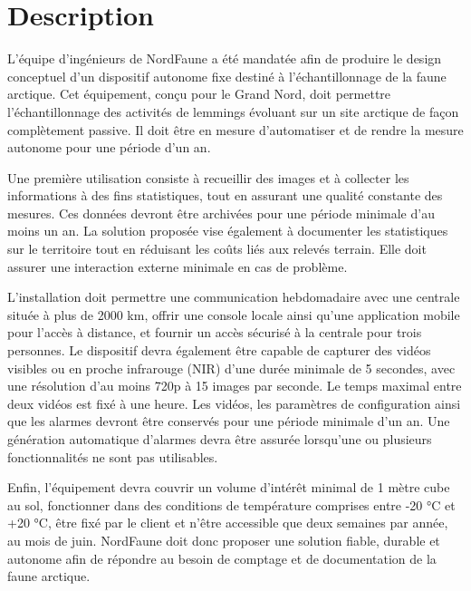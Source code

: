 %
%

\chapter{Description}
\label{s:description}

L'équipe d'ingénieurs de NordFaune a été mandatée afin de produire le design conceptuel d'un dispositif autonome fixe destiné à l'échantillonnage de la faune arctique. Cet équipement, conçu pour le Grand Nord, doit permettre l'échantillonnage des activités de lemmings évoluant sur un site arctique de façon complètement passive. Il doit être en mesure d'automatiser et de rendre la mesure autonome pour une période d'un an. 

\bigskip
Une première utilisation consiste à recueillir des images et à collecter les informations à des fins statistiques, tout en assurant une qualité constante des mesures. Ces données devront être archivées pour une période minimale d'au moins un an. La solution proposée vise également à documenter les statistiques sur le territoire tout en réduisant les coûts liés aux relevés terrain. Elle doit assurer une interaction externe minimale en cas de problème. 

\bigskip
L'installation doit permettre une communication hebdomadaire avec une centrale située à plus de 2000 km, offrir une console locale ainsi qu'une application mobile pour l'accès à distance, et fournir un accès sécurisé à la centrale pour trois personnes. Le dispositif devra également être capable de capturer des vidéos visibles ou en proche infrarouge (NIR) d'une durée minimale de 5 secondes, avec une résolution d'au moins 720p à 15 images par seconde. Le temps maximal entre deux vidéos est fixé à une heure. Les vidéos, les paramètres de configuration ainsi que les alarmes devront être conservés pour une période minimale d'un an. Une génération automatique d'alarmes devra être assurée lorsqu'une ou plusieurs fonctionnalités ne sont pas utilisables.

\bigskip
Enfin, l'équipement devra couvrir un volume d'intérêt minimal de 1 mètre cube au sol, fonctionner dans des conditions de température comprises entre -20 °C et +20 °C, être fixé par le client et n'être accessible que deux semaines par année, au mois de juin. NordFaune doit donc proposer une solution fiable, durable et autonome afin de répondre au besoin de comptage et de documentation de la faune arctique.

